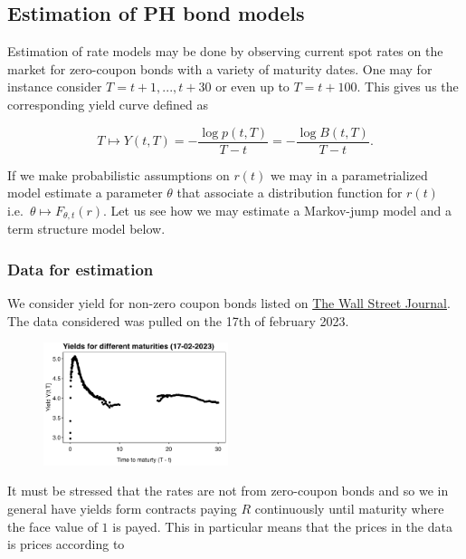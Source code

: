\documentclass[a4paper,10pt,openany]{book}
\begin{document}
\hypertarget{estimation-of-ph-bond-models}{%
\subsection{Estimation of PH bond models}\label{estimation-of-ph-bond-models}}

Estimation of rate models may be done by observing current spot rates on the market for zero-coupon bonds with a variety of maturity dates. One may for instance consider \(T=t+1,...,t+30\) or even up to \(T=t+100\). This gives us the corresponding yield curve defined as

\[
T\mapsto Y(t,T)=-\frac{\log p(t,T)}{T-t}=-\frac{\log B(t,T)}{T-t}.
\]

If we make probabilistic assumptions on \(r(t)\) we may in a parametrialized model estimate a parameter \(\theta\) that associate a distribution function for \(r(t)\) i.e.~\(\theta \mapsto F_{\theta,t}(r)\). Let us see how we may estimate a Markov-jump model and a term structure model below.

\hypertarget{data-for-estimation}{%
\subsubsection{Data for estimation}\label{data-for-estimation}}

We consider yield for non-zero coupon bonds listed on \href{https://www.wsj.com/market-data/bonds/treasuries?mod=md_bond_view_treasury_quotes}{The Wall Street Journal}. The data considered was pulled on the 17th of february 2023.

\begin{figure}[H]
  \begin{center}
    \includegraphics[width=0.48\textwidth]{figures/ph_est_data.png}
  \end{center}
\end{figure}

It must be stressed that the rates are not from zero-coupon bonds and so we in general have yields form contracts paying \(R\) continuously until maturity where the face value of \(1\) is payed. This in particular means that the prices in the data is prices according to
\end{document}
